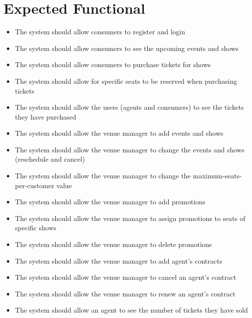 \section{Expected Functional}

\begin{itemize} %
  \item The system should allow consumers to register and login
  \item The system should allow consumers to see the upcoming events and shows
  \item The system should allow consumers to purchase tickets for shows
  \item The system should allow for specific seats to be reserved when purchasing tickets
  \item The system should allow the users (agents and consumers) to see the tickets they have purchased
  \item The system should allow the venue manager to add events and shows
  \item The system should allow the venue manager to change the events and shows (reschedule and cancel)
  \item The system should allow the venue manager to change the maximum-seats-per-customer value
  \item The system should allow the venue manager to add promotions
  \item The system should allow the venue manager to assign promotions to seats of specific shows
  \item The system should allow the venue manager to delete promotions
  \item The system should allow the venue manager to add agent's contracts
  \item The system should allow the venue manager to cancel an agent's contract
  \item The system should allow the venue manager to renew an agent's contract
  \item The system should allow an agent to see the number of tickets they have sold
\end{itemize}
